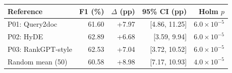 \begin{tabular}{@{}lrrrr@{}}
\toprule
Reference & F1 (\%) & $\Delta$ (pp) & 95\% CI (pp) & Holm $p$\\
\midrule
P01: Query2doc & 61.60 & +7.97 & [4.86, 11.25] & $6.0\!\times\!10^{-5}$\\
P02: HyDE & 62.89 & +6.68 & [3.59, 9.94] & $6.0\!\times\!10^{-5}$\\
P03: RankGPT-style & 62.53 & +7.04 & [3.72, 10.52] & $6.0\!\times\!10^{-5}$\\
Random mean (50) & 60.58 & +8.98 & [7.17, 10.93] & $4.0\!\times\!10^{-5}$\\
\bottomrule
\end{tabular}
